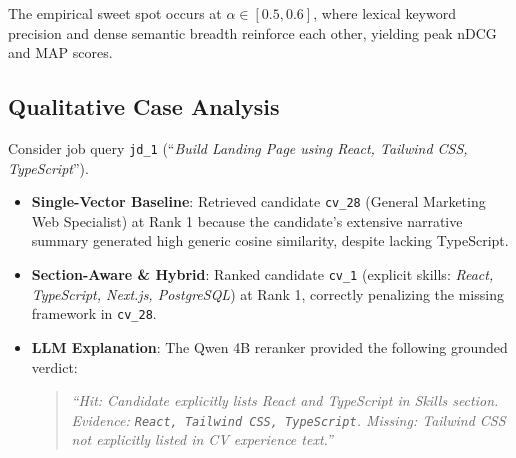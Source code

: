 \documentclass[runningheads]{llncs}
\begin{document}
\begin{table}[htbp]
\centering\small
\caption{Impact of Semantic Fusion Weight $\alpha$ on Ranking Metrics (JD $\rightarrow$ CV).}
\label{tab:alpha}
\end{table}

The empirical sweet spot occurs at $\alpha \in [0.5, 0.6]$, where lexical keyword precision and dense semantic breadth reinforce each other, yielding peak nDCG and MAP scores.

\subsection{Qualitative Case Analysis}
Consider job query \texttt{jd\_1} (``\emph{Build Landing Page using React, Tailwind CSS, TypeScript}'').
\begin{itemize}
    \item \textbf{Single-Vector Baseline}: Retrieved candidate \texttt{cv\_28} (General Marketing Web Specialist) at Rank 1 because the candidate's extensive narrative summary generated high generic cosine similarity, despite lacking TypeScript.
    \item \textbf{Section-Aware \& Hybrid}: Ranked candidate \texttt{cv\_1} (explicit skills: \emph{React, TypeScript, Next.js, PostgreSQL}) at Rank 1, correctly penalizing the missing framework in \texttt{cv\_28}.
    \item \textbf{LLM Explanation}: The Qwen 4B reranker provided the following grounded verdict:
    \begin{quote}
        \small\textit{``Hit: Candidate explicitly lists React and TypeScript in Skills section. Evidence: \texttt{React, Tailwind CSS, TypeScript}. Missing: Tailwind CSS not explicitly listed in CV experience text.''}
    \end{quote}
\end{itemize}
\end{document}
